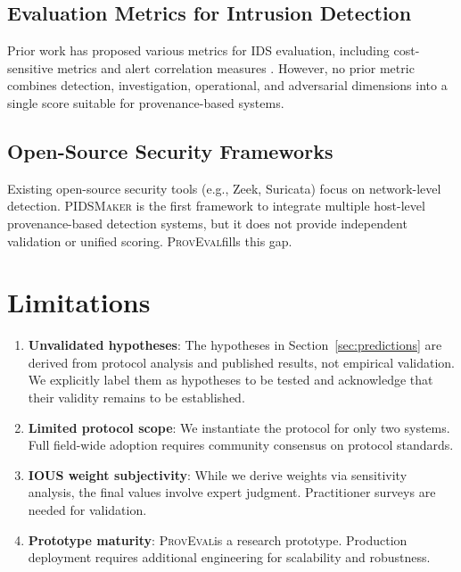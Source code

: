 \documentclass[11pt,a4paper]{article}
\newcommand{\system}[1]{\textsc{#1}}
\newcommand{\proveval}{\textsc{ProvEval}}
\begin{document}
\subsection{Evaluation Metrics for Intrusion Detection}

Prior work has proposed various metrics for IDS evaluation, including cost-sensitive metrics \cite{fan2000using} and alert correlation measures \cite{valdes2001statistical}. However, no prior metric combines detection, investigation, operational, and adversarial dimensions into a single score suitable for provenance-based systems.

\subsection{Open-Source Security Frameworks}

Existing open-source security tools (e.g., Zeek, Suricata) focus on network-level detection. \system{PIDSMaker} \cite{bilot2025pidsmaker} is the first framework to integrate multiple host-level provenance-based detection systems, but it does not provide independent validation or unified scoring. \proveval fills this gap.

\section{Limitations}
\label{sec:limitations}

\begin{enumerate}[leftmargin=*]
    \item \textbf{Unvalidated hypotheses}: The hypotheses in Section~\ref{sec:predictions} are derived from protocol analysis and published results, not empirical validation. We explicitly label them as hypotheses to be tested and acknowledge that their validity remains to be established.

    \item \textbf{Limited protocol scope}: We instantiate the protocol for only two systems. Full field-wide adoption requires community consensus on protocol standards.

    \item \textbf{IOUS weight subjectivity}: While we derive weights via sensitivity analysis, the final values involve expert judgment. Practitioner surveys are needed for validation.

    \item \textbf{Prototype maturity}: \proveval is a research prototype. Production deployment requires additional engineering for scalability and robustness.
\end{enumerate}
\end{document}
